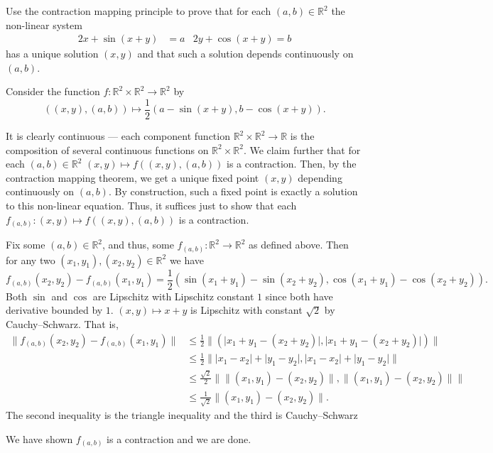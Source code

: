 \documentclass[12 pt, letterpaper]{hmcpset}
\begin{document}
\begin{problem}[1.]
	Use the contraction mapping principle to prove that for each $(a, b) \in \mathbb{R}^{2}$ the non-linear system
	\begin{align*}
		2x + \sin{(x + y)} & = a & 2y + \cos{(x + y)} = b
	\end{align*}
	has a unique solution $(x, y)$ and that such a solution depends continuously on $(a, b)$.
\end{problem}

\begin{solution}
	Consider the function $f : \mathbb{R}^{2} \times \mathbb{R}^{2} \to \mathbb{R}^{2}$ by
	\[
		((x, y), (a, b)) \mapsto \frac{1}{2} \left ( a - \sin{(x + y)}, b - \cos{(x + y)}  \right ).
	\]

	It is clearly continuous --- each component function $\mathbb{R}^{2} \times \mathbb{R}^{2} \to \mathbb{R}$ is the composition of several continuous functions on $\mathbb{R}^{2} \times \mathbb{R}^{2}$. We claim further that for each $(a, b) \in \mathbb{R}^{2}$ $(x, y) \mapsto f((x, y), (a, b))$ is a contraction. Then, by the contraction mapping theorem, we get a unique fixed point $(x, y)$ depending continuously on $(a, b)$. By construction, such a fixed point is exactly a solution to this non-linear equation. Thus, it suffices just to show that each $f_{(a, b)} : (x, y) \mapsto f((x, y), (a, b))$ is a contraction.

	Fix some $(a, b) \in \mathbb{R}^{2}$, and thus, some $f_{(a, b)} : \mathbb{R}^{2} \to \mathbb{R}^{2}$ as defined above. Then for any two $(x_{1}, y_{1}), (x_{2}, y_{2}) \in \mathbb{R}^{2}$ we have
	\[
		f_{(a, b)}(x_{2}, y_{2}) - f_{(a, b)}(x_{1}, y_{1}) = \frac{1}{2} (\sin{(x_{1} + y_{1})} - \sin{(x_{2} + y_{2})}, \cos{(x_{1} + y_{1})} - \cos{(x_{2} + y_{2})}).
	\]
	Both $\sin$ and $\cos$ are Lipschitz with Lipschitz constant $1$ since both have derivative bounded by $1$. $(x, y) \mapsto x + y$ is Lipschitz with constant $\sqrt{2}$ by Cauchy--Schwarz. That is,
	\begin{align*}
		\lVert f_{(a, b)}(x_{2}, y_{2}) - f_{(a, b)}(x_{1}, y_{1}) \rVert & \le \frac{1}{2} \lVert (\lvert x_{1} + y_{1} - (x_{2} + y_{2}) \rvert, \lvert x_{1} + y_{1} - (x_{2} + y_{2}) \rvert) \rVert \\
										& \le \frac{1}{2} \lVert \lvert x_{1} - x_{2} \rvert + \lvert y_{1} - y_{2} \rvert, \lvert x_{1} - x_{2} \rvert + \lvert y_{1} - y_{2} \rvert \rVert \\
										& \le \frac{\sqrt{2}}{2} \lVert \lVert (x_{1}, y_{1}) - (x_{2}, y_{2}) \rVert, \lVert (x_{1}, y_{1}) - (x_{2}, y_{2}) \rVert \rVert \\
										& \le \frac{1}{\sqrt{2}} \lVert (x_{1}, y_{1}) - (x_{2}, y_{2}) \rVert.
	\end{align*}
	The second inequality is the triangle inequality and the third is Cauchy--Schwarz

	We have shown $f_{(a, b)}$ is a contraction and we are done.
\end{solution}
\end{document}
